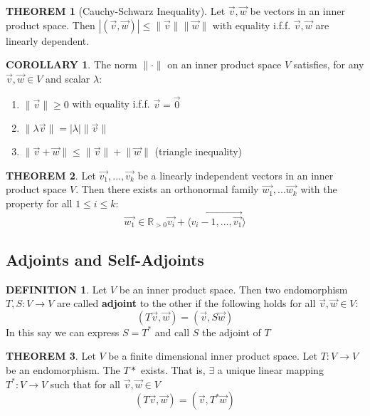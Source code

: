 \documentclass[10pt]{article}
\theoremstyle{definition}
\newtheorem{definition}{DEFINITION}[subsection]
\newtheorem{theorem}{THEOREM}[subsection]
\newcommand{\norm}[1]{\lVert #1 \rVert}
\newtheorem{corollary}{COROLLARY}[subsection]
\begin{document}
\begin{theorem}[Cauchy-Schwarz Inequality]
    Let $\vec{v}, \vec{w}$ be vectors in an inner product space. Then $|(\vec{v}, \vec{w})| \leq \norm{\vec{v}}\norm{\vec{w}}$ with equality i.f.f. $\vec{v}, \vec{w}$ are linearly dependent.
\end{theorem}

\begin{corollary}
    The norm $\norm{\cdot}$ on an inner product space $V$ satisfies, for any $\vec{v}, \vec{w}\in V$ and scalar $\lambda$:
    \begin{enumerate}
        \item $\norm{\vec{v}} \geq 0$ with equality i.f.f. $\vec{v} = \vec{0}$
        \item $\norm{\lambda\vec{v}} = |\lambda|\norm{\vec{v}}$
        \item $\norm{\vec{v}+ \vec{w}} \leq \norm{\vec{v}} + \norm{\vec{w}}$ (triangle inequality)
    \end{enumerate}
\end{corollary}

\begin{theorem}
    Let $\vec{v_1},..., \vec{v_k}$ be a linearly independent vectors in an inner product space $V$. Then there exists an orthonormal family $\vec{w_1},... \vec{w_k}$ with the property for all $1 \leq i \leq k$: $$\vec{w_1} \in \mathbb{R}_{>0}\vec{v_i}+ \langle\vec{v_i-1,...,\vec{v_1}}\rangle$$
\end{theorem}

\subsection{Adjoints and Self-Adjoints}
\begin{definition}
    Let $V$ be an inner product space. Then two endomorphism $T,S:V \rightarrow V$ are called \textbf{adjoint} to the other if the following holds for all $\vec{v}, \vec{w} \in V$: $$(T\vec{v}, \vec{w}) = (\vec{v}, S\vec{w})$$
    In this say we can express $S = T^*$ and call $S$ the adjoint of $T$ 
\end{definition}

\begin{theorem}
    Let $V$ be a finite dimensional inner product space. Let $T:V \rightarrow V$ be an endomorphism. The $T*$ exists. That is, $\exists$ a unique linear mapping $T^*: V \rightarrow V$ such that for all $\vec{v}, \vec{w} \in V$
    $$(T\vec{v}, \vec{w}) = (\vec{v}, T^*\vec{w})$$
\end{theorem}
\end{document}
